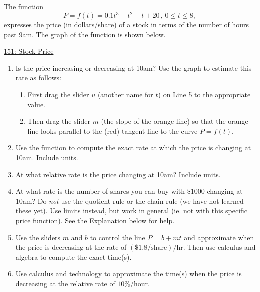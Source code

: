 \documentclass{ximera}
\begin{document}
\begin{question}  \label{Qkkdgkk44437777}
The function
\[
      P = f(t) = 0.1t^3-t^2+t+20 \, , \, 0\leq t \leq 8 ,
\]
expresses the price (in dollars/share) of a stock in terms of the number of hours past 9am. The graph of the function is shown below.

\begin{onlineOnly}
    \begin{center}
\end{center}
\end{onlineOnly}

\href{https://www.desmos.com/calculator/gpqicgxvk3}{151: Stock Price}

\begin{enumerate}
\item Is the price increasing or decreasing at 10am? Use the graph to estimate this rate as follows:

\begin{enumerate}
\item First drag the slider $u$ (another name for $t$) on Line 5 to the appropriate value.

\item Then drag the slider $m$ (the slope of the orange line) so that the orange line looks parallel to the (red) tangent line to the curve $P=f(t)$.
\end{enumerate}


\item Use the function to compute the exact rate at which the price is changing at 10am. Include units.

\item At what relative rate is the price changing at 10am? Include units.

\item At what rate is the number of shares you can buy with $\$1000$ changing at 10am? Do \emph{not} use the quotient rule or the chain rule (we have not learned these yet). Use limits instead, but work in general (ie. not with this specific price function).
See the Explanation below for help.

\item Use the sliders $m$ and $b$ to control the line $P=b+mt$ and approximate when the price is decreasing at the rate of $(\$1.8/\text{share})/\text{hr}$. Then use calculus and algebra to compute the exact time(s).

\item  Use calculus and technology to approximate the time(s) when the price is decreasing at the relative rate of $10\%$/hour.



\end{enumerate}
\end{question}
\end{document}
